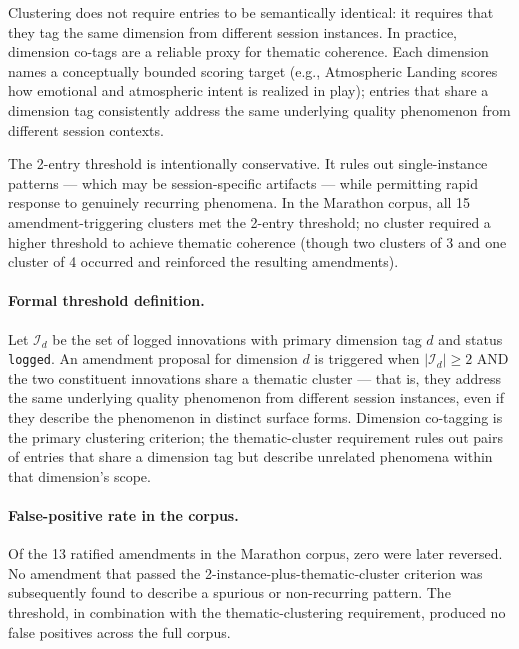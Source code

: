 Clustering does not require entries to be semantically identical: it requires
that they tag the same dimension from different session instances. In practice,
dimension co-tags are a reliable proxy for thematic coherence. Each dimension
names a conceptually bounded scoring target (e.g., Atmospheric Landing scores
how emotional and atmospheric intent is realized in play); entries that share a
dimension tag consistently address the same underlying quality phenomenon from
different session contexts.

The 2-entry threshold is intentionally conservative. It rules out single-instance
patterns --- which may be session-specific artifacts --- while permitting rapid
response to genuinely recurring phenomena. In the Marathon corpus, all 15
amendment-triggering clusters met the 2-entry threshold; no cluster required
a higher threshold to achieve thematic coherence (though two clusters of 3 and
one cluster of 4 occurred and reinforced the resulting amendments).

\paragraph{Formal threshold definition.}
Let $\mathcal{I}_d$ be the set of logged innovations with primary dimension tag $d$
and status \texttt{logged}. An amendment proposal for dimension $d$ is triggered when
$|\mathcal{I}_d| \geq 2$ AND the two constituent innovations share a thematic cluster
--- that is, they address the same underlying quality phenomenon from different session
instances, even if they describe the phenomenon in distinct surface forms. Dimension
co-tagging is the primary clustering criterion; the thematic-cluster requirement rules
out pairs of entries that share a dimension tag but describe unrelated phenomena within
that dimension's scope.

\paragraph{False-positive rate in the corpus.}
Of the 13 ratified amendments in the Marathon corpus, zero were later reversed. No
amendment that passed the 2-instance-plus-thematic-cluster criterion was subsequently
found to describe a spurious or non-recurring pattern. The threshold, in combination
with the thematic-clustering requirement, produced no false positives across the full
corpus.

